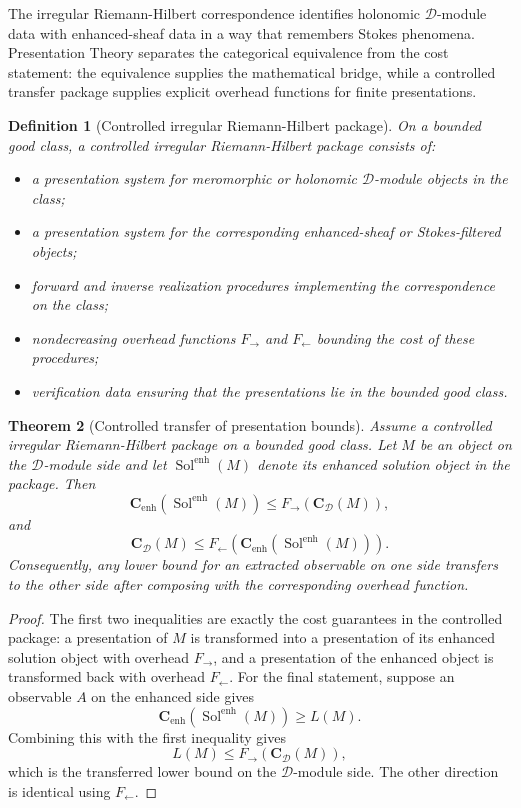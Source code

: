 \documentclass[11pt]{article}
\newtheorem{theorem}{Theorem}[section]
\newtheorem{definition}[theorem]{Definition}
\begin{document}
The irregular Riemann-Hilbert correspondence identifies holonomic \(\mathcal D\)-module data with enhanced-sheaf data in a way that remembers Stokes phenomena.  Presentation Theory separates the categorical equivalence from the cost statement: the equivalence supplies the mathematical bridge, while a controlled transfer package supplies explicit overhead functions for finite presentations.

\begin{definition}[Controlled irregular Riemann-Hilbert package]
On a bounded good class, a controlled irregular Riemann-Hilbert package consists of:
\begin{itemize}[leftmargin=2em]
\item a presentation system for meromorphic or holonomic \(\mathcal D\)-module objects in the class;
\item a presentation system for the corresponding enhanced-sheaf or Stokes-filtered objects;
\item forward and inverse realization procedures implementing the correspondence on the class;
\item nondecreasing overhead functions \(F_{\rightarrow}\) and \(F_{\leftarrow}\) bounding the cost of these procedures;
\item verification data ensuring that the presentations lie in the bounded good class.
\end{itemize}
\end{definition}

\begin{theorem}[Controlled transfer of presentation bounds]
Assume a controlled irregular Riemann-Hilbert package on a bounded good class.  Let \(M\) be an object on the \(\mathcal D\)-module side and let \(\operatorname{Sol}^{\operatorname{enh}}(M)\) denote its enhanced solution object in the package.  Then
\[
\mathbf C_{\operatorname{enh}}(\operatorname{Sol}^{\operatorname{enh}}(M))
\le
F_{\rightarrow}(\mathbf C_{\mathcal D}(M)),
\]
and
\[
\mathbf C_{\mathcal D}(M)
\le
F_{\leftarrow}(\mathbf C_{\operatorname{enh}}(\operatorname{Sol}^{\operatorname{enh}}(M))).
\]
Consequently, any lower bound for an extracted observable on one side transfers to the other side after composing with the corresponding overhead function.
\end{theorem}

\begin{proof}
The first two inequalities are exactly the cost guarantees in the controlled package: a presentation of \(M\) is transformed into a presentation of its enhanced solution object with overhead \(F_{\rightarrow}\), and a presentation of the enhanced object is transformed back with overhead \(F_{\leftarrow}\).  For the final statement, suppose an observable \(A\) on the enhanced side gives
\[
\mathbf C_{\operatorname{enh}}(\operatorname{Sol}^{\operatorname{enh}}(M))
\ge L(M).
\]
Combining this with the first inequality gives
\[
L(M)\le F_{\rightarrow}(\mathbf C_{\mathcal D}(M)),
\]
which is the transferred lower bound on the \(\mathcal D\)-module side.  The other direction is identical using \(F_{\leftarrow}\).
\end{proof}
\end{document}
